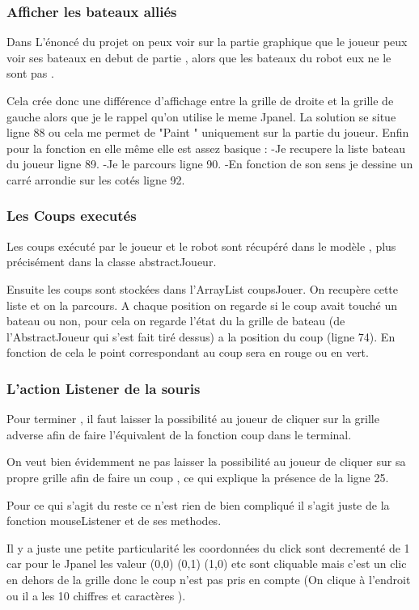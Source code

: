 \documentclass[a4paper,12pt]{article} %
\begin{document}
\subsubsection{Afficher les bateaux alliés}
Dans L’énoncé du projet on peux voir sur la partie graphique que le joueur peux voir ses bateaux en debut de partie , alors que les bateaux du robot eux ne le sont pas .

Cela crée donc une différence d'affichage entre la grille de droite et la grille de gauche alors que je le rappel qu'on utilise le meme Jpanel.
La solution se situe ligne 88 ou cela me permet de "Paint " uniquement sur la partie du joueur.
Enfin pour la fonction en elle même elle est assez basique :
-Je recupere la liste bateau du joueur ligne 89.
-Je le parcours ligne 90.
-En fonction de son sens je dessine un carré arrondie sur les cotés ligne 92.
\subsubsection{Les Coups executés}
Les coups exécuté par le joueur et le robot sont récupéré dans le modèle , plus précisément dans la classe abstractJoueur.

Ensuite les coups sont stockées dans l'ArrayList coupsJouer. On recupère cette liste et on la parcours. A chaque position on regarde si le coup avait touché un bateau ou non, pour cela on regarde l'état du la grille de bateau (de l'AbstractJoueur qui s'est fait tiré dessus) a la position du coup (ligne 74). En fonction de cela le point correspondant au coup sera en rouge ou en vert.
\subsubsection{L'action Listener de la souris}\label{coupGraphique}
Pour terminer , il faut laisser la possibilité au joueur de cliquer sur la grille adverse afin de faire l'équivalent de la fonction coup dans le terminal.

On veut bien évidemment ne pas laisser la possibilité au joueur de cliquer sur sa propre grille afin de faire un coup , ce qui explique la présence de la ligne 25.

Pour ce qui s'agit du reste ce n'est rien de bien compliqué il s'agit juste de la fonction mouseListener et de ses methodes. 

Il y a juste une petite particularité les coordonnées du click sont decrementé de 1 car pour le Jpanel les valeur (0,0) (0,1) (1,0) etc sont cliquable mais c'est un clic en dehors de la grille donc le coup n'est pas pris en compte (On clique à l'endroit ou il a les 10 chiffres et caractères ).
\end{document}
